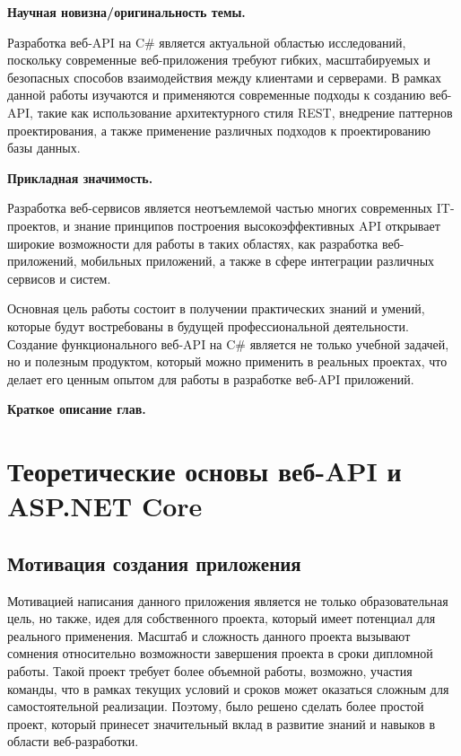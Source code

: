 \documentclass[a4paper,12pt]{report}
\begin{document}
\textbf{Научная новизна/оригинальность темы.}

Разработка веб-\acs{API} на C\# является актуальной областью исследований, поскольку современные веб-приложения требуют гибких, 
масштабируемых и безопасных способов взаимодействия между клиентами и серверами. В рамках данной работы изучаются
и применяются современные подходы к созданию веб-\acs{API}, такие как использование архитектурного стиля \acs{REST}, внедрение паттернов 
проектирования, а также применение различных подходов к проектированию базы данных.

\textbf{Прикладная значимость.}

Разработка веб-сервисов является неотъемлемой частью многих современных IT-проектов, и знание принципов построения высокоэффективных 
API открывает широкие возможности для работы в таких областях, как разработка веб-приложений, мобильных приложений, 
а также в сфере интеграции различных сервисов и систем.

Основная цель работы состоит в получении практических знаний и умений, которые будут востребованы в будущей профессиональной деятельности. 
Создание функционального веб-\acs{API} на C\# является не только учебной задачей, но и полезным продуктом, который можно применить в реальных проектах, 
что делает его ценным опытом для работы в разработке веб-\acs{API} приложений.

\textbf{Краткое описание глав.}



\chapter{Теоретические основы веб-\acs{API} и ASP.NET Core}\label{intro_chapter_title}

\section{Мотивация создания приложения}

Мотивацией написания данного приложения является не только образовательная цель, но также, идея для собственного проекта, который
имеет потенциал для реального применения. Масштаб и сложность данного проекта вызывают сомнения относительно возможности завершения проекта в сроки 
дипломной работы. Такой проект требует более объемной работы, возможно, участия команды, что в рамках текущих условий и сроков может оказаться 
сложным для самостоятельной реализации. Поэтому, было решено сделать более простой проект, который принесет значительный вклад в развитие знаний и навыков 
в области веб-разработки.
\end{document}

